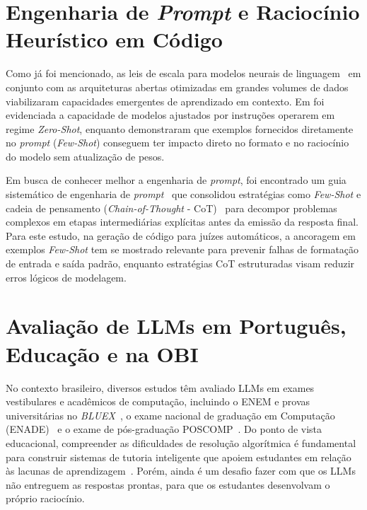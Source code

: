 \section{Engenharia de \texorpdfstring{\textit{Prompt}}{Prompt} e Raciocínio Heurístico em Código}\label{sec:rel-prompt}

Como já foi mencionado, as leis de escala para modelos neurais de linguagem~\citep{kaplan2020scaling} em conjunto com as arquiteturas abertas otimizadas em grandes volumes de dados~\citep{touvron2023llama} viabilizaram capacidades emergentes de aprendizado em contexto. Em \citet{wei2021finetuned} foi evidenciada a capacidade de modelos ajustados por instruções operarem em regime \textit{Zero-Shot}, enquanto \citet{brown2020language} demonstraram que exemplos fornecidos diretamente no \textit{prompt} (\textit{Few-Shot}) conseguem ter impacto direto no formato e no raciocínio do modelo sem atualização de pesos.

Em busca de conhecer melhor a engenharia de \textit{prompt}, foi encontrado um guia sistemático de engenharia de \textit{prompt}~\citep{dair2025prompt} que consolidou estratégias como \textit{Few-Shot} e cadeia de pensamento (\textit{Chain-of-Thought} - CoT)~\citep{wei2022chain} para decompor problemas complexos em etapas intermediárias explícitas antes da emissão da resposta final. Para este estudo, na geração de código para juízes automáticos, a ancoragem em exemplos \textit{Few-Shot} tem se mostrado relevante para prevenir falhas de formatação de entrada e saída padrão, enquanto estratégias CoT estruturadas visam reduzir erros lógicos de modelagem.

\section{Avaliação de LLMs em Português, Educação e na OBI}\label{sec:rel-obi}

No contexto brasileiro, diversos estudos têm avaliado LLMs em exames vestibulares e acadêmicos de computação, incluindo o ENEM e provas universitárias no \textit{BLUEX}~\citep{nunes2023evaluating,almeida2023bluex}, o exame nacional de graduação em Computação (ENADE)~\citep{mendonca2024evaluating} e o exame de pós-graduação POSCOMP~\citep{viegas2025assessing}. Do ponto de vista educacional, compreender as dificuldades de resolução algorítmica é fundamental para construir sistemas de tutoria inteligente que apoiem estudantes em relação às lacunas de aprendizagem~\citep{priyanka2025development,peng2025enhancing}. Porém, ainda é um desafio fazer com que os LLMs não entreguem as respostas prontas, para que os estudantes desenvolvam o próprio raciocínio.

